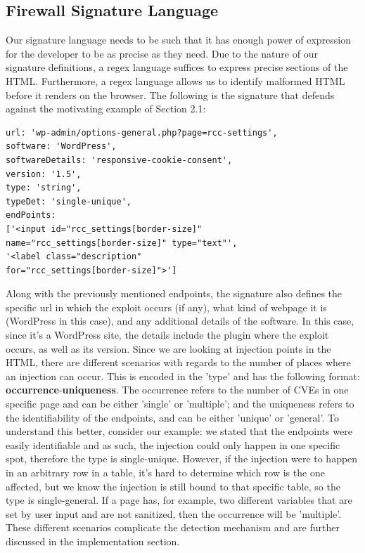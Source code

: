  \subsection{Firewall Signature Language}
 Our signature language needs to be such that it has enough power of expression for the developer to be as precise as they need. Due to the nature of our signature definitions, a regex language suffices to express precise sections of the HTML. Furthermore, a regex language allows us to identify malformed HTML before it renders on the browser. The following is the signature that defends against the motivating example of Section 2.1:
 \lstset{basicstyle=\small}
\begin{lstlisting}
url: 'wp-admin/options-general.php?page=rcc-settings',
software: 'WordPress',
softwareDetails: 'responsive-cookie-consent',
version: '1.5',
type: 'string',
typeDet: 'single-unique',
endPoints: 
['<input id="rcc_settings[border-size]" 
name="rcc_settings[border-size]" type="text"',
'<label class="description" 
for="rcc_settings[border-size]">']
\end{lstlisting}
 
 Along with the previously mentioned endpoints, the signature also defines the specific url in which the exploit occurs (if any), what kind of webpage it is (WordPress in this case), and any additional details of the software. In this case, since it's a WordPress site, the details include the plugin where the exploit occurs, as well as its version. Since we are looking at injection points in the HTML, there are different scenarios with regards to the number of places where an injection can occur. This is encoded in the 'type' and has the following format: \textbf{occurrence}-\textbf{uniqueness}. The occurrence refers to the number of CVEs in one specific page and can be either 'single' or 'multiple'; and the uniqueness refers to the identifiability of the endpoints, and can be either 'unique' or 'general'. To understand this better, consider our example: we stated that the endpoints were easily identifiable and as such, the injection could only happen in one specific spot, therefore the type is single-unique. However, if the injection were to happen in an arbitrary row in a table, it's hard to determine which row is the one affected, but we know the injection is still bound to that specific table, so the type is single-general. If a page has, for example, two different variables that are set by user input and are not sanitized, then the occurrence will be 'multiple'. These different scenarios complicate the detection mechanism and are further discussed in the implementation section.
 
